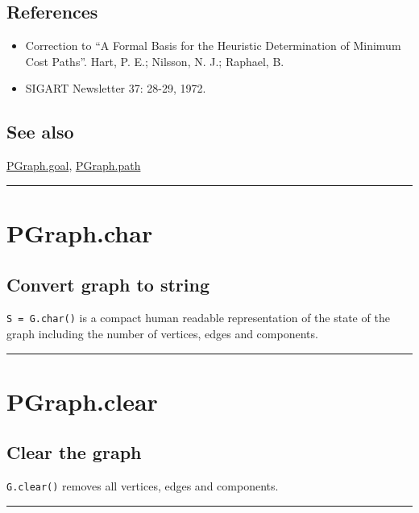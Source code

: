 \subsection*{References}
\begin{itemize}
  \item Correction to ``A Formal Basis for the Heuristic Determination of Minimum Cost Paths''.    Hart, P. E.; Nilsson, N. J.; Raphael, B.
  \item SIGART Newsletter 37: 28-29, 1972.
\end{itemize}

\subsection*{See also}


\hyperlink{PGraph.goal}{\color{blue} PGraph.goal}, \hyperlink{PGraph.path}{\color{blue} PGraph.path}

\vspace{1.5ex}\hrule

\hypertarget{PGraph.char}{\section*{PGraph.char}}
\subsection*{Convert graph to string}


\texttt{S = G.char()} is a compact human readable representation of the
state of the graph including the number of vertices, edges and components.

\vspace{1.5ex}\hrule

\hypertarget{PGraph.clear}{\section*{PGraph.clear}}
\subsection*{Clear the graph}


\texttt{G.clear()} removes all vertices, edges and components.

\vspace{1.5ex}\hrule


